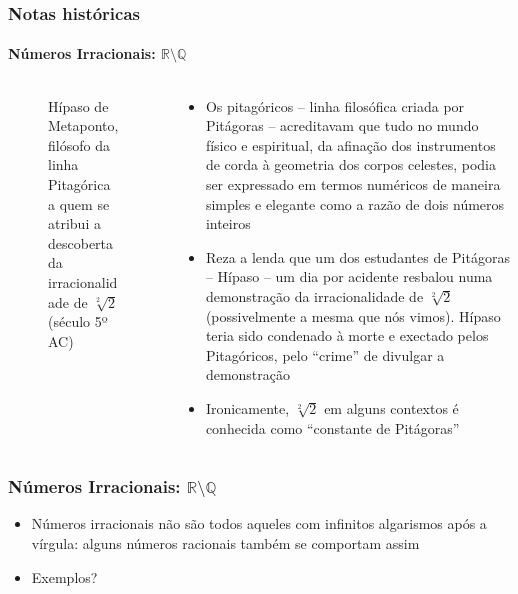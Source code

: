 \documentclass[usenames,dvipsnames,svgnames]{beamer}
\begin{document}
\begin{frame}
	
	\frametitle{Notas históricas}
	\framesubtitle{Números Irracionais: $\mathbb{R} \setminus \mathbb{Q}$}

	\begin{columns}[t]
	\begin{column}{.25\textwidth}
		\begin{figure}
			\caption{\small Hípaso de Metaponto, filósofo da linha Pitagórica a quem se atribui a descoberta da irracionalidade de $\sqrt[2]{2}$ (século 5º AC)}
		\end{figure}
	\end{column}
	\begin{column}{.75\textwidth}
		\small
		\begin{itemize}
		\item Os pitagóricos -- linha filosófica criada por Pitágoras -- acreditavam que tudo no mundo físico e espiritual, da afinação dos instrumentos de corda à geometria dos corpos celestes, podia ser expressado em termos numéricos de maneira simples e elegante como a razão de dois números inteiros
		\item Reza a lenda que um dos estudantes de Pitágoras -- Hípaso -- um dia por acidente resbalou numa demonstração da irracionalidade de $\sqrt[2]{2}$ (possivelmente a mesma que nós vimos). Hípaso teria sido condenado à morte e exectado pelos Pitagóricos, pelo ``crime'' de divulgar a demonstração
		\item Ironicamente, $\sqrt[2]{2}$ em alguns contextos é conhecida como ``constante de Pitágoras''
		\end{itemize}
	\end{column}
	\end{columns}

\end{frame}

\begin{frame}
	
	\frametitle{Números Irracionais: $\mathbb{R} \setminus \mathbb{Q}$}

	\begin{itemize}
		\item Números irracionais não são todos aqueles com infinitos algarismos após a vírgula: alguns números racionais também se comportam assim
		\item Exemplos?
	\end{itemize}

\end{frame}
\end{document}
